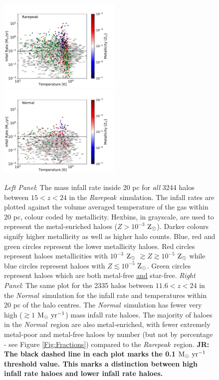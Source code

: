 \documentclass[twocolumn,iop,revtex4]{openjournal}
\newcommand{\msolaryr} {$\rm{M_{\odot}~yr^{-1}}~$}
\newcommand{\msolaryrc} {$\rm{M_{\odot}~yr^{-1}}$}
\newcommand{\zsolar} {$\rm{Z_{\odot}}~$}
\newcommand{\zsolarc} {$\rm{Z_{\odot}}$}
\newcommand{\rarepeak} {\textit{Rarepeak~}}
\newcommand{\normal} {\textit{Normal~}}
\def\jr#1{{\color{blue} \bf JR:  #1}}
\begin{document}
\begin{figure}
\centering
\begin{minipage}{175mm}      \begin{center} 
\centerline{
\includegraphics[width=0.525\textwidth]{FIGURES/Rarepeak_MdotTZ.pdf}
\includegraphics[width=0.525\textwidth]{FIGURES/Normal_MdotTZ.pdf}}
\caption{\textit{Left Panel}: The mass infall rate inside 20 pc for \textit{all} 
  3244 halos between $15<z<24$ in 
  the \rarepeak simulation. The infall rates are plotted
  against the volume averaged temperature of the gas within 20 pc, colour coded by metallicity. Hexbins, in
  grayscale, are used to represent the metal-enriched haloes ($Z > 10^{-3}$ \zsolarc).
  Darker colours signify higher metallicity as well as higher halo counts. Blue, red and green circles
  represent the lower metallicity haloes. Red circles represent haloes metallicities
  with $10^{-3} $ \zsolar $\gtrsim Z \gtrsim 10^{-5}$ \zsolar while blue circles represent
  haloes with $Z \lesssim 10^{-5}$ \zsolarc. Green circles represent haloes which are both
  metal-free \underline{and} star-free.  \textit{Right Panel}: The same plot for the 2335 halos between $11.6<z<24$ in the \normal simulation
  for the infall rate and temperatures within 20 pc of the halo centres.
  The \normal simulation has fewer very high ($ \gtrsim 1 $ \msolaryrc) mass infall rate haloes.
  The majority of haloes in the \normal region are also metal-enriched, with fewer extremely metal-poor and
  metal-free haloes by number (but not by percentage - see Figure \ref{Fig:Fractions}) compared to the \rarepeak region.
  \jr{The black dashed line in each plot marks the 0.1 \msolaryr threshold value. This marks a distinction
  between high infall rate haloes and lower infall rate haloes.}}
  \label{Fig:Scatter}
\end{center} \end{minipage}

\end{figure}
\end{document}
